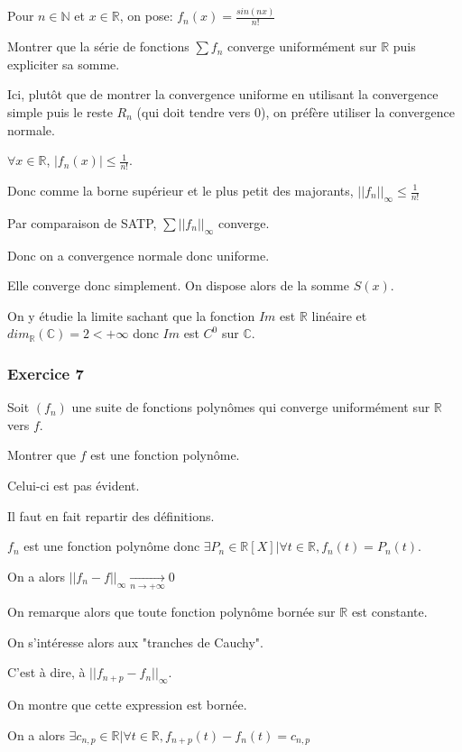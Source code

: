 \documentclass[a4paper, 11pt, hidelinks]{article}
\newcommand{\tend}{\underset{n \to + \infty}{\longrightarrow} }
\begin{document}
Pour $n \in \mathbb{N}$ et $x\in \mathbb{R}$, on pose: $f_n(x)=\frac{sin(nx)}{n!}$

Montrer que la série de fonctions $\sum f_n$ converge uniformément sur $\mathbb{R}$ puis expliciter sa somme.

Ici, plutôt que de montrer la convergence uniforme en utilisant la convergence simple puis le reste $R_n$ (qui doit tendre vers $0$),
on préfère utiliser la convergence normale.

$\forall x \in \mathbb{R}$, $|f_n(x)|\leq \frac{1}{n!}$.

Donc comme la borne supérieur et le plus petit des majorants, $||f_n||_{\infty}\leq \frac{1}{n!}$

Par comparaison de SATP, $\sum ||f_n||_{\infty}$ converge.

Donc on a convergence normale donc uniforme.

Elle converge donc simplement. On dispose alors de la somme $S(x)$.

On y étudie la limite sachant que la fonction $Im$ est $\mathbb{R}$ linéaire et $dim_{\mathbb{R}}(\mathbb{C})=2< +\infty$ donc $Im$ est $C^0$ sur $\mathbb{C}$.




\subsubsection{Exercice 7}

Soit $(f_n)$ une suite de fonctions polynômes qui converge uniformément sur $\mathbb{R}$ vers $f$.

Montrer que $f$ est une fonction polynôme.


Celui-ci est pas évident.

Il faut en fait repartir des définitions.

$f_n$ est une fonction polynôme donc $\exists P_n \in \mathbb{R}[X] | \forall t \in \mathbb{R}, f_n(t)=P_n(t)$.

On a alors $||f_n -f ||_{\infty} \tend 0$

On remarque alors que toute fonction polynôme bornée sur $\mathbb{R}$ est constante.


On s'intéresse alors aux "tranches de Cauchy".

C'est à dire, à $||f_{n+p}-f_n||_{\infty}$.

On montre que cette expression est bornée.

On a alors $\exists c_{n,p} \in \mathbb{R} | \forall t \in \mathbb{R}, f_{n+p}(t) -f_n(t)=c_{n,p}$
\end{document}
